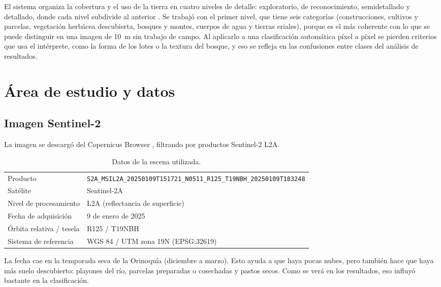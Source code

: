 \documentclass[11pt,letterpaper]{article}
\begin{document}
El sistema organiza la cobertura y el uso de la tierra en cuatro niveles de detalle: exploratorio, de reconocimiento, semidetallado y detallado, donde cada nivel subdivide al anterior \citep{ciaf}. Se trabajó con el primer nivel, que tiene seis categorías (construcciones, cultivos y parcelas, vegetación herbácea descubierta, bosques y montes, cuerpos de agua y tierras eriales), porque es el más coherente con lo que se puede distinguir en una imagen de 10~m sin trabajo de campo. Al aplicarlo a una clasificación automática píxel a píxel se pierden criterios que usa el intérprete, como la forma de los lotes o la textura del bosque, y eso se refleja en las confusiones entre clases del análisis de resultados.

\section{Área de estudio y datos}
\label{sec:datos}

\subsection{Imagen Sentinel-2}
La imagen se descargó del Copernicus Browser \citep{copernicus}, filtrando por productos Sentinel-2 L2A.

\begin{table}[H]
\centering
\caption{Datos de la escena utilizada.}
\label{tab:escena}
\footnotesize
\setlength{\tabcolsep}{4pt}
\begin{tabular}{@{}lp{9cm}@{}}
\toprule
Producto & \texttt{\scriptsize S2A\_MSIL2A\_20250109T151721\_N0511\_R125\_T19NBH\_20250109T183248} \\
Satélite & Sentinel-2A \\
Nivel de procesamiento & L2A (reflectancia de superficie) \\
Fecha de adquisición & 9 de enero de 2025 \\
Órbita relativa / tesela & R125 / T19NBH \\
Sistema de referencia & WGS 84 / UTM zona 19N (EPSG:32619) \\
\bottomrule
\end{tabular}
\end{table}

La fecha cae en la temporada seca de la Orinoquía (diciembre a marzo). Esto ayuda a que haya pocas nubes,
pero también hace que haya más suelo descubierto: playones del río, parcelas preparadas o cosechadas y
pastos secos. Como se verá en los resultados, eso influyó bastante en la clasificación.
\end{document}
